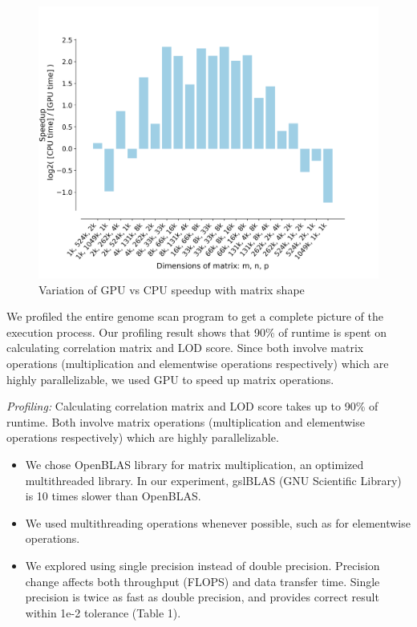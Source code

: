 \documentclass[9pt,twocolumn,twoside,lineno]{gsag3jnl}
\begin{document}
\begin{figure}[!htb]
	\centering
	\caption{Variation of GPU vs CPU speedup with matrix shape
	}
	\label{GPUCPUShape}
	\includegraphics[scale = 0.36]{figs/speedup.png}
\end{figure} 

\iffalse
We profiled the entire genome scan program to get a complete picture of the execution process.
Our profiling result shows that 90\% of runtime is spent on calculating correlation matrix and LOD score. 
Since both involve matrix operations (multiplication and elementwise operations respectively) which are highly parallelizable, we used GPU to speed up matrix operations. 


{\em Profiling:} Calculating correlation matrix and LOD score
takes up to 90\% of runtime.  Both involve matrix operations
(multiplication and elementwise operations respectively) which
are highly parallelizable.
      \begin{itemize}
	\item We chose OpenBLAS library for matrix multiplication, an
	optimized multithreaded library.  In our experiment, gslBLAS
	(GNU Scientific Library) is 10 times slower than OpenBLAS.
	\item We used multithreading operations whenever possible, such as
	for elementwise operations.
	\item We explored using single precision instead of double
	precision.  Precision change affects both throughput (FLOPS) and
	data transfer time.  Single precision is twice
	as fast as double precision, and provides correct result
	within 1e-2 tolerance (Table 1).
\end{itemize}
\end{document}
